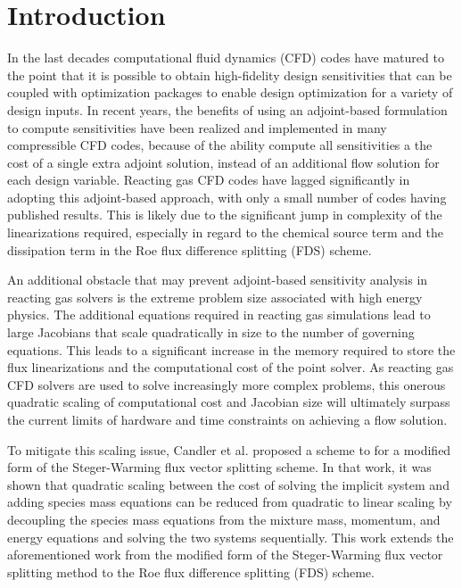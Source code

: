 \chapter{Introduction}
\label{chapter-one}

In the last decades computational fluid dynamics (CFD) codes have matured to the
point that it is possible to obtain high-fidelity design sensitivities that can
be coupled with optimization packages to enable design optimization for a
variety of design inputs\cite{baysal1992aerodynamic, balagangadhar2001design}.
In recent years, the benefits of using an adjoint-based formulation to compute
sensitivities have been realized and implemented in many compressible CFD
codes\cite{mavriplis-2006, nemec-aftosmis-adjoint, nielsen2002recent}, because
of the ability compute all sensitivities a the cost of a single extra adjoint
solution, instead of an additional flow solution for each design variable.
Reacting gas CFD codes have lagged significantly in adopting this adjoint-based
approach, with only a small number of codes having published
results\cite{Copeland, Barcelona}.  This is likely due to the significant
jump in complexity of the linearizations required, especially in regard to the
chemical source term and the dissipation term in the Roe flux difference
splitting (FDS) scheme\cite{roe}.

An additional obstacle that may prevent adjoint-based sensitivity analysis in
reacting gas solvers is the extreme problem size associated with high energy
physics.  The additional equations required in reacting gas simulations lead to
large Jacobians that scale quadratically in size to the number of governing
equations.  This leads to a significant increase in the memory required to store
the flux linearizations and the computational cost of the point solver.  As
reacting gas CFD solvers are used to solve increasingly more complex problems,
this onerous quadratic scaling of computational cost and Jacobian size will
ultimately surpass the current limits of hardware and time constraints on
achieving a flow solution\cite{fischer}.

To mitigate this scaling issue, Candler et al.\cite{candler} proposed a scheme
to for a modified form of the Steger-Warming flux vector splitting
scheme\cite{MacCormack,Steger}. In that work, it was shown that quadratic
scaling between the cost of solving the implicit system and adding species mass
equations can be reduced from quadratic to linear scaling by decoupling the
species mass equations from the mixture mass, momentum, and energy equations and
solving the two systems sequentially.  This work extends the aforementioned work
from the modified form of the Steger-Warming flux vector splitting
method to the Roe flux difference splitting (FDS) scheme.

